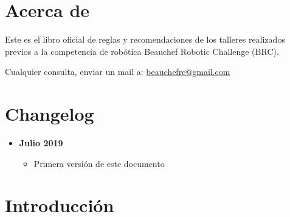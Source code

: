 
\section*{Acerca de}
Este es el libro oficial de reglas y recomendaciones de los talleres realizados previos a la competencia de robótica Beauchef Robotic Challenge (BRC).

Cualquier consulta, enviar un mail a: \href{mailto:beauchefrc@gmail.com}{beauchefrc@gmail.com}






\section*{Changelog}

\begin{itemize}
  \item \textbf{Julio 2019}
  \begin{itemize}
    \item Primera versión de este documento
  \end{itemize}
\end{itemize}

\pagebreak

\section{Introducción}

